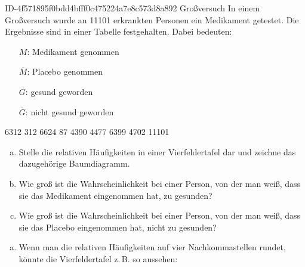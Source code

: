 \begin{exercise}
      {ID-4f571895f0bdd4bfff0c475224a7e8c573d8a892}
      {Großversuch}
  \ifproblem\problem
    In einem Großversuch wurde an \num{11101} erkrankten Personen ein
    Medikament getestet. Die Ergebnisse sind in einer Tabelle festgehalten.
    Dabei bedeuten:
    \begin{center}
      \begin{minipage}{0.45\linewidth}
        \begin{itemize}
          \setlength{\itemsep}{-0.1\baselineskip}
          \item[$M$:]            Medikament genommen
          \item[$\overline{M}$:] Placebo genommen
          \item[$G$:]            gesund geworden
          \item[$\overline{G}$:] nicht gesund geworden
        \end{itemize}%
      \end{minipage}%
      \begin{minipage}{0.45\linewidth}
        \centering
        \begin{fourfoldtable}
          \numbers
           {6312}  {312}  {6624}
             {87} {4390}  {4477}
           {6399} {4702} {11101}
        \end{fourfoldtable}
      \end{minipage}%
    \end{center}%
    \begin{enumerate}[a)]
      \item Stelle die relativen Häufigkeiten in einer Vierfeldertafel dar
            und zeichne das dazugehörige Baumdiagramm.
      \item Wie groß ist die Wahrscheinlichkeit bei einer Person, von der
            man weiß, dass sie das Medikament eingenommen hat, zu gesunden?
      \item Wie groß ist die Wahrscheinlichkeit bei einer Person, von der
            man weiß, dass sie das Placebo eingenommen hat, nicht zu gesunden?
    \end{enumerate}
  \fi
  \ifoutcome\outcome
    \begin{enumerate}[a)]
      \item Wenn man die relativen Häufigkeiten auf vier Nachkommastellen
            rundet, könnte die Vierfeldertafel z.\,B. so aussehen:

\end{enumerate}
\end{exercise}
